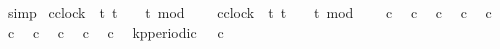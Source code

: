 \begin{isabellebody}
\ simp\isanewline
{}\isamarkupfalse%
%
\endisatagproof
{\isafoldproof}%
%
\isadelimproof
%
\endisadelimproof
%
\isadelimdocument
%
\endisadelimdocument
%
\isatagdocument
%
\isamarkuptrue%
%
\endisatagdocument
{\isafolddocument}%
%
\isadelimdocument
%
\endisadelimdocument
{}\isamarkupfalse%
\ {\isacartoucheopen}c{}{\isacharcolon}{\isacharcolon}clock\ {\isasymequiv}\ {\isacharparenleft}{\isasymlambda}t{\isachardot}\ t\ {\isasymge}\ {}\ {\isasymand}\ {\isacharparenleft}t{\isacharminus}{}{\isacharparenright}\ mod\ {}\ {\isacharequal}\ {}{\isacharparenright}{\isacartoucheclose}\isanewline
{}\isamarkupfalse%
\ {\isacartoucheopen}c{}{\isacharcolon}{\isacharcolon}clock\ {\isasymequiv}\ {\isacharparenleft}{\isasymlambda}t{\isachardot}\ t\ {\isasymge}\ {}\ {\isasymand}\ {\isacharparenleft}t{\isacharminus}{}{\isacharparenright}\ mod\ {}\ {\isacharequal}\ {}{\isacharparenright}{\isacartoucheclose}\isanewline
\isanewline
{}\isamarkupfalse%
\ {\isacartoucheopen}c{}\ {}{\isacartoucheclose}\isanewline
{}\isamarkupfalse%
\ {\isacartoucheopen}c{}\ {}{\isacartoucheclose}\isanewline
{}\isamarkupfalse%
\ {\isacartoucheopen}c{}\ {}{\isacartoucheclose}\isanewline
{}\isamarkupfalse%
\ {\isacartoucheopen}c{}\ {}{\isacartoucheclose}\isanewline
\isanewline
{}\isamarkupfalse%
\ {\isacartoucheopen}c{}\ {}{\isacartoucheclose}\isanewline
{}\isamarkupfalse%
\ {\isacartoucheopen}c{}\ {}{\isacartoucheclose}\isanewline
{}\isamarkupfalse%
\ {\isacartoucheopen}c{}\ {}{\isacartoucheclose}\isanewline
{}\isamarkupfalse%
\ {\isacartoucheopen}c{}\ {}{\isacartoucheclose}\isanewline
{}\isamarkupfalse%
\ {\isacartoucheopen}c{}\ {}{\isacartoucheclose}\isanewline
{}\isamarkupfalse%
\ {\isacartoucheopen}c{}\ {}{\isacartoucheclose}\isanewline
\isanewline
{}\isamarkupfalse%
\ {\isacartoucheopen}kp{\isacharunderscore}periodic\ {}\ {}\ c{}{\isacartoucheclose}\isanewline
%
\isadelimproof
\ \ %
\endisadelimproof
%
\isatagproof
{}\isamarkupfalse%

\end{isabellebody}
